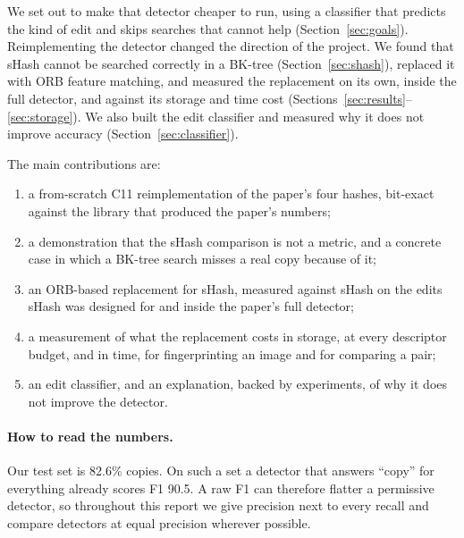 We set out to make that detector cheaper to run, using a classifier that predicts the kind of edit
and skips searches that cannot help (Section~\ref{sec:goals}). Reimplementing the detector
changed the direction of the project. We found that sHash cannot be searched correctly in a
BK-tree (Section~\ref{sec:shash}), replaced it with ORB feature matching, and measured the
replacement on its own, inside the full detector, and against its storage and time cost
(Sections~\ref{sec:results}--\ref{sec:storage}). We also built the edit classifier and
measured why it does not improve accuracy (Section~\ref{sec:classifier}).

The main contributions are:
\begin{enumerate}
  \item a from-scratch C11 reimplementation of the paper's four hashes, bit-exact against the
        library that produced the paper's numbers;
  \item a demonstration that the sHash comparison is not a metric, and a concrete case in
        which a BK-tree search misses a real copy because of it;
  \item an ORB-based replacement for sHash, measured against sHash on the edits sHash was
        designed for and inside the paper's full detector;
  \item a measurement of what the replacement costs in storage, at every descriptor budget,
        and in time, for fingerprinting an image and for comparing a pair;
  \item an edit classifier, and an explanation, backed by experiments, of why it does not
        improve the detector.
\end{enumerate}

\paragraph{How to read the numbers.} Our test set is 82.6\% copies. On such a set a
detector that answers ``copy'' for everything already scores F1 90.5. A raw F1 can
therefore flatter a permissive detector, so throughout this report we give precision next to
every recall and compare detectors at equal precision wherever possible.
